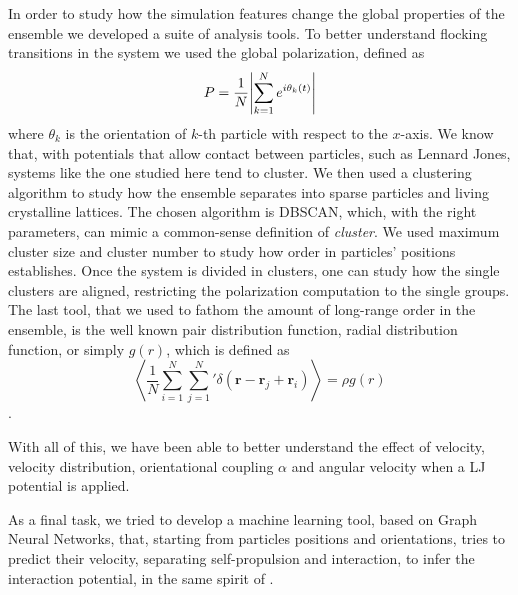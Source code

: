 \documentclass[a4paper, notitlepage]{report} %
\begin{document}
	In order to study how the simulation features change the global properties of the ensemble we developed a suite of analysis tools.
	To better understand flocking transitions in the system we used the global polarization, defined as 
	\begin{equation}
		P = \frac{1}{N} \abs{\sum_{k=1}^{N} e^{i \theta_k(t)}} 
	\end{equation}
	where $\theta_k$ is the orientation of $k$-th particle with respect to the $x$-axis.
	We know that, with potentials that allow contact between particles, such as Lennard Jones, systems like the one studied here tend to cluster.
	We then used a clustering algorithm to study how the ensemble separates into sparse particles and living crystalline lattices.
	The chosen algorithm is DBSCAN, which, with the right parameters, can mimic a common-sense definition of \emph{cluster}.
	We used maximum cluster size and cluster number to study how order in particles' positions establishes.
	Once the system is divided in clusters, one can study how the single clusters are aligned, restricting the polarization computation to the single groups.
	The last tool, that we used to fathom the amount of long-range order in the ensemble, is the well known pair distribution function, radial distribution function, or simply $g(r)$, which is defined \cite{hansen90a} as 
	\begin{equation}
		\left\langle \frac{1}{N} \sum_{i=1}^{N} \sum_{j=1}^{N}{}' \delta (\mathbf{r} - \mathbf{r}_j + \mathbf{r}_i) \right\rangle = \rho g(r)
	\end{equation}.
	
	With all of this, we have been able to better understand the effect of velocity, velocity distribution, orientational coupling $\alpha$ and angular velocity when a LJ potential is applied.
	
	As a final task, we tried to develop a machine learning tool, based on Graph Neural Networks, that, starting from particles positions and orientations, tries to predict their velocity, separating self-propulsion and interaction, to infer the interaction potential, in the same spirit of \cite{ruiz-garcia_discovering_2024}.
	\printbibliography
\end{document}
